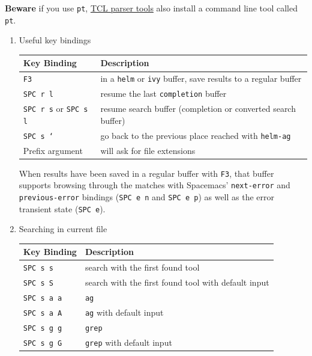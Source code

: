 \documentclass[11pt]{article}
\begin{document}
\textbf{Beware} if you use \texttt{pt}, \href{https://core.tcl.tk/tcllib/doc/trunk/embedded/www/tcllib/files/apps/pt.html}{TCL parser tools} also install a command line tool
called \texttt{pt}.

\begin{enumerate}
\item Useful key bindings
\label{sec:orge6e5316}

\begin{center}
\begin{tabular}{ll}
Key Binding & Description\\
\hline
\texttt{F3} & in a \texttt{helm} or \texttt{ivy} buffer, save results to a regular buffer\\
\texttt{SPC r l} & resume the last \texttt{completion} buffer\\
\texttt{SPC r s} or \texttt{SPC s l} & resume search buffer (completion or converted search buffer)\\
\texttt{SPC s `} & go back to the previous place reached with \texttt{helm-ag}\\
Prefix argument & will ask for file extensions\\
\end{tabular}
\end{center}

When results have been saved in a regular buffer with \texttt{F3}, that buffer supports
browsing through the matches with Spacemacs’ \texttt{next-error} and \texttt{previous-error}
bindings (\texttt{SPC e n} and \texttt{SPC e p}) as well as the error transient state (\texttt{SPC e}).

\item Searching in current file
\label{sec:org4ce0316}

\begin{center}
\begin{tabular}{ll}
Key Binding & Description\\
\hline
\texttt{SPC s s} & search with the first found tool\\
\texttt{SPC s S} & search with the first found tool with default input\\
\texttt{SPC s a a} & \texttt{ag}\\
\texttt{SPC s a A} & \texttt{ag} with default input\\
\texttt{SPC s g g} & \texttt{grep}\\
\texttt{SPC s g G} & \texttt{grep} with default input\\
\end{tabular}
\end{center}


\end{enumerate}
\end{document}
